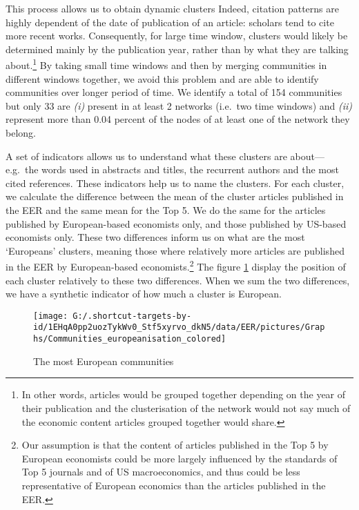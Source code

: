 \documentclass[]{elsarticle} %
\begin{document}
This process allows us to obtain dynamic clusters Indeed, citation
patterns are highly dependent of the date of publication of an article:
scholars tend to cite more recent works. Consequently, for large time
window, clusters would likely be determined mainly by the publication
year, rather than by what they are talking about.\footnote{In other
  words, articles would be grouped together depending on the year of
  their publication and the clusterisation of the network would not say
  much of the economic content articles grouped together would share.}
By taking small time windows and then by merging communities in
different windows together, we avoid this problem and are able to
identify communities over longer period of time. We identify a total of
154 communities but only 33 are \emph{(i)} present in at least 2
networks (i.e.~two time windows) and \emph{(ii)} represent more than
0.04 percent of the nodes of at least one of the network they belong.

A set of indicators allows us to understand what these clusters are
about---e.g.~the words used in abstracts and titles, the recurrent
authors and the most cited references. These indicators help us to name
the clusters. For each cluster, we calculate the difference between the
mean of the cluster articles published in the EER and the same mean for
the Top 5. We do the same for the articles published by European-based
economists only, and those published by US-based economists only. These
two differences inform us on what are the most `Europeans' clusters,
meaning those where relatively more articles are published in the EER by
European-based economists.\footnote{Our assumption is that the content
  of articles published in the Top 5 by European economists could be
  more largely influenced by the standards of Top 5 journals and of US
  macroeconomics, and thus could be less representative of European
  economics than the articles published in the EER.} The figure
\ref{fig:plot-community-diff} display the position of each cluster
relatively to these two differences. When we sum the two differences, we
have a synthetic indicator of how much a cluster is European.

\begin{figure}[h]

{\centering \texttt{[image: G:/.shortcut-targets-by-id/1EHqA0pp2uozTykWv0\_Stf5xyrvo\_dkN5/data/EER/pictures/Graphs/Communities\_europeanisation\_colored]} 

}

\caption{The most European communities}\label{fig:plot-community-diff}
\end{figure}
\end{document}
